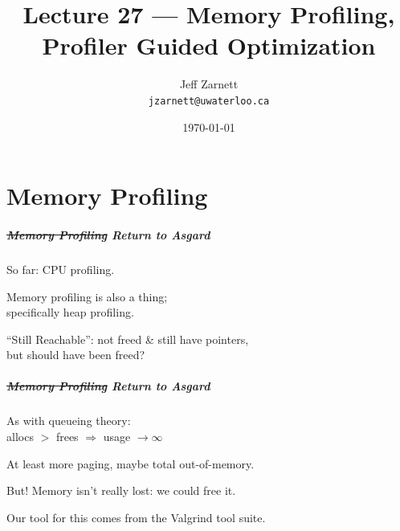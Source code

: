 
\usepackage{soul}

\title{Lecture 27 --- Memory Profiling, Profiler Guided Optimization }

\author{Jeff Zarnett \\ \small \texttt{jzarnett@uwaterloo.ca}}
\date{\today}




\begin{frame}
  \titlepage

 \end{frame}

\part{Memory Profiling}
\begin{frame}
\partpage
\end{frame}

\begin{frame}
\frametitle{\st{Memory Profiling} Return to Asgard}

\large
\begin{changemargin}{2cm}
So far: CPU profiling. 

Memory profiling is also a thing; \\
\qquad specifically heap profiling.

``Still Reachable'': not freed \& still have pointers, \\
\qquad but should have been freed?
\end{changemargin}

\end{frame}



\begin{frame}
\frametitle{\st{Memory Profiling} Return to Asgard}

\large
\begin{changemargin}{2cm}
As with queueing theory:\\
\qquad allocs $>$ frees $\Longrightarrow$ usage $\rightarrow \infty$

At least more paging, maybe total out-of-memory.

But! Memory isn't really lost: we could free it.

Our tool for this comes from the Valgrind tool suite.
\end{changemargin}

\end{frame}


